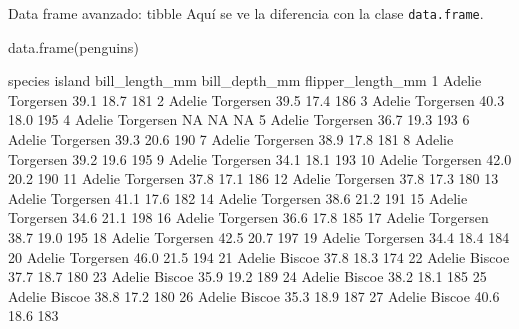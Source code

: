 \documentclass[
  ignorenonframetext,
  aspectratio=169]{beamer}
\newenvironment{Shaded}{\begin{snugshade}}{\end{snugshade}}
\newcommand{\FunctionTok}[1]{\textcolor[rgb]{0.00,0.00,0.00}{#1}}
\newcommand{\NormalTok}[1]{#1}
\let\oldverbatim\verbatim
\let\endoldverbatim\endverbatim
\renewenvironment{verbatim}{\tiny\oldverbatim}{\endoldverbatim}
\begin{document}
\begin{frame}[fragile]{Data frame avanzado: tibble}
\protect\hypertarget{data-frame-avanzado-tibble-6}{}
Aquí se ve la diferencia con la clase \texttt{data.frame}.

\begin{Shaded}
\begin{Highlighting}[]
\FunctionTok{data.frame}\NormalTok{(penguins)}
\end{Highlighting}
\end{Shaded}

\begin{verbatim}
      species    island bill_length_mm bill_depth_mm flipper_length_mm
1      Adelie Torgersen           39.1          18.7               181
2      Adelie Torgersen           39.5          17.4               186
3      Adelie Torgersen           40.3          18.0               195
4      Adelie Torgersen             NA            NA                NA
5      Adelie Torgersen           36.7          19.3               193
6      Adelie Torgersen           39.3          20.6               190
7      Adelie Torgersen           38.9          17.8               181
8      Adelie Torgersen           39.2          19.6               195
9      Adelie Torgersen           34.1          18.1               193
10     Adelie Torgersen           42.0          20.2               190
11     Adelie Torgersen           37.8          17.1               186
12     Adelie Torgersen           37.8          17.3               180
13     Adelie Torgersen           41.1          17.6               182
14     Adelie Torgersen           38.6          21.2               191
15     Adelie Torgersen           34.6          21.1               198
16     Adelie Torgersen           36.6          17.8               185
17     Adelie Torgersen           38.7          19.0               195
18     Adelie Torgersen           42.5          20.7               197
19     Adelie Torgersen           34.4          18.4               184
20     Adelie Torgersen           46.0          21.5               194
21     Adelie    Biscoe           37.8          18.3               174
22     Adelie    Biscoe           37.7          18.7               180
23     Adelie    Biscoe           35.9          19.2               189
24     Adelie    Biscoe           38.2          18.1               185
25     Adelie    Biscoe           38.8          17.2               180
26     Adelie    Biscoe           35.3          18.9               187
27     Adelie    Biscoe           40.6          18.6               183

\end{verbatim}
\end{frame}
\end{document}
